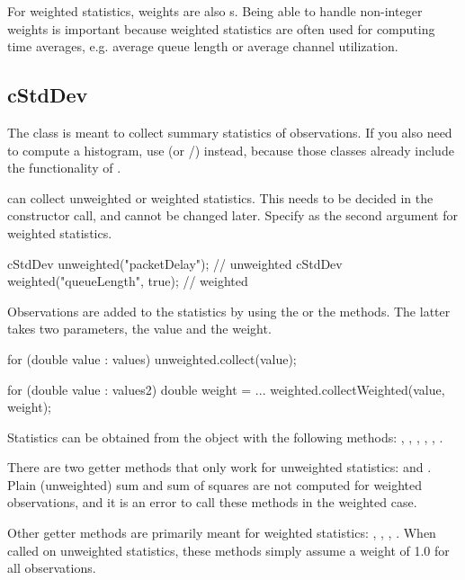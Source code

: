For weighted statistics, weights are also s. Being able to
handle non-integer weights is important because weighted statistics
are often used for computing time averages, e.g. average queue length
or average channel utilization.

\subsection{cStdDev}
\label{sec:sim-lib:cstatistic-and-descendants}

The  class is meant to collect summary statistics of
observations. If you also need to compute a histogram, use 
(or /) instead, because those classes
already include the functionality of .

 can collect unweighted or weighted statistics. This needs
to be decided in the constructor call, and cannot be changed later.
Specify  as the second argument for weighted statistics.

\begin{cpp}
cStdDev unweighted("packetDelay");  // unweighted
cStdDev weighted("queueLength", true); // weighted
\end{cpp}

Observations are added to the statistics by using the 
or the  methods. The latter takes two parameters,
the value and the weight.

\begin{cpp}
for (double value : values)
    unweighted.collect(value);

for (double value : values2) {
    double weight = ...
    weighted.collectWeighted(value, weight);
}
\end{cpp}

Statistics can be obtained from the object with the following methods:
, , , ,
, .

There are two getter methods that only work for unweighted statistics:
 and . Plain (unweighted) sum and
sum of squares are not computed for weighted observations, and it is
an error to call these methods in the weighted case.

Other getter methods are primarily meant for weighted statistics:
, ,
, .
When called on unweighted statistics, these methods simply
assume a weight of 1.0 for all observations.

